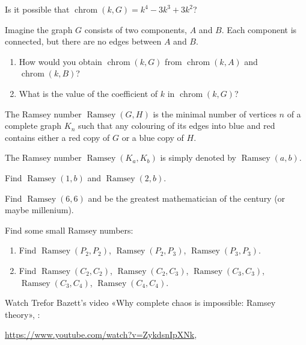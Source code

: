\documentclass[12pt]{article}
\DeclareMathOperator{\chrom}{chrom}
\DeclareMathOperator{\ramsey}{Ramsey}
\begin{document}
\begin{exercise}
    Is it possible that $\chrom(k, G)=k^4 - 3k^3 + 3k^2$?
\end{exercise}

\begin{exercise}
    Imagine the graph $G$ consists of two components, $A$ and $B$. Each component is connected, but there are no edges between $A$ and $B$.
\begin{enumerate}[label=\alph*)]
    \item How would you obtain $\chrom(k, G)$ from $\chrom(k, A)$ and $\chrom(k, B)$?
    \item What is the value of the coefficient of $k$ in $\chrom(k, G)$?
\end{enumerate}

\end{exercise}


\begin{definition}
    The Ramsey number $\ramsey(G, H)$ is the minimal number of vertices $n$ of a complete graph $K_n$ 
    such that any colouring of its edges  into blue and red contains either a red copy of $G$ or a blue copy of $H$.

    The Ramsey number $\ramsey(K_a, K_b)$ is simply denoted by $\ramsey(a, b)$.
\end{definition}


\begin{exercise}
    Find $\ramsey(1, b)$ and $\ramsey(2, b)$.
\end{exercise}

\begin{exercise}
    Find $\ramsey(6, 6)$ and be the greatest mathematician of the century (or maybe millenium). 
\end{exercise}

\begin{exercise}
    Find some small Ramsey numbers:
    \begin{enumerate}[label=\alph*)]
        \item Find $\ramsey(P_2, P_2)$, $\ramsey(P_2, P_3)$, $\ramsey(P_3, P_3)$.
        \item Find $\ramsey(C_2, C_2)$, $\ramsey(C_2, C_3)$, $\ramsey(C_3, C_3)$, $\ramsey(C_3, C_4)$, $\ramsey(C_4, C_4)$.
    \end{enumerate}
\end{exercise}

\begin{exercise}
    Watch Trefor Bazett's video «Why complete chaos is impossible: Ramsey theory», \cite{bazett2023chaos}:

    \url{https://www.youtube.com/watch?v=ZykdsnIpXNk}, 
\end{exercise}
\end{document}
